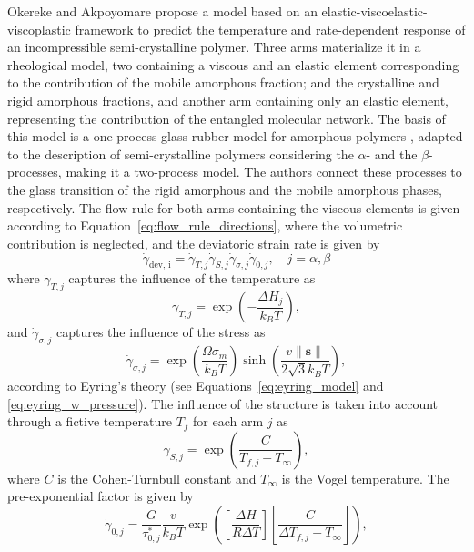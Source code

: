 Okereke and Akpoyomare \citep{okerekeTwoprocessConstitutiveModel2019} propose a model based on an elastic-viscoelastic-viscoplastic framework to predict the temperature and rate-dependent response of an incompressible semi-crystalline polymer.
Three arms materialize it in a rheological model, two containing a viscous and an elastic element corresponding to the contribution of the mobile amorphous fraction; and the crystalline and rigid amorphous fractions, and another arm containing only an elastic element, representing the contribution of the entangled molecular network.
The basis of this model is a one-process glass-rubber model for amorphous polymers \citep{buckleyGlassrubberConstitutiveModel1995}, adapted to the description of semi-crystalline polymers considering the $\alpha$- and the $\beta$-processes, making it a two-process model.
The authors connect these processes to the glass transition of the rigid amorphous and the mobile amorphous phases, respectively.
The flow rule for both arms containing the viscous elements is given according to Equation~\eqref{eq:flow_rule_directions}, where the volumetric contribution is neglected, and the deviatoric strain rate is given by
\begin{equation}
	\dot \gamma_\text{dev, i} = \dot \gamma_{T,j}\dot\gamma_{S,j}\dot\gamma_{\sigma,j}\dot\gamma_{0,j},\quad j=\alpha, \beta
\end{equation}
where $\dot \gamma_{T,j}$ captures the influence of the temperature as
\begin{equation}
	\dot \gamma_{T,j} = \exp\left(-\frac{\Delta H_j}{k_B T}\right),
\end{equation}
and $\dot \gamma_{\sigma,j}$ captures the influence of the stress as
\begin{equation}
	\dot\gamma_{\sigma,j} = \exp\left(\frac{\Omega\sigma_m}{k_B T}\right)\sinh\left(\frac{v\|\bm s\|}{2\sqrt{3}k_BT}\right),
\end{equation}
according to Eyring's theory (see Equations~\eqref{eq:eyring_model} and \eqref{eq:eyring_w_pressure}).
The influence of the structure is taken into account through a fictive temperature $T_f$ for each arm $j$ as
\begin{equation}
	\dot\gamma_{S,j} = \exp\left(\frac{C}{T_{f,j}-T_\infty}\right),
\end{equation}
where $C$ is the Cohen-Turnbull constant and $T_\infty$ is the Vogel temperature.
The pre-exponential factor is given by
\begin{equation}
	\dot \gamma_{0,j} = \frac{G}{\tau^*_{0,j}} \frac{v}{k_B T}\exp\left(\left[\frac{\Delta H}{R\Delta T}\right]\left[\frac{C}{\Delta T_{f,j} - T_\infty}\right]\right),
\end{equation}
